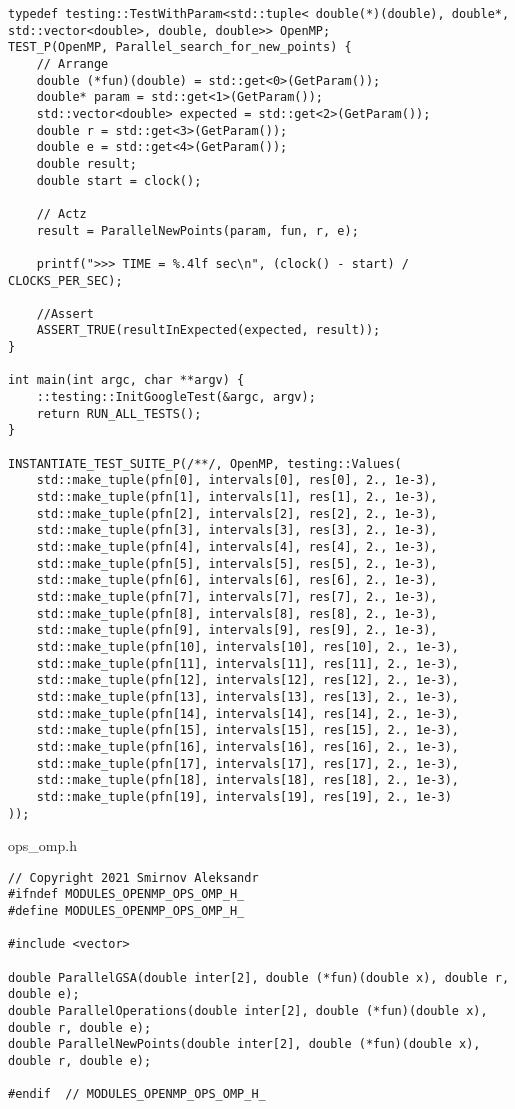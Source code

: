 \documentclass{report}
\begin{document}
\begin{lstlisting}
typedef testing::TestWithParam<std::tuple< double(*)(double), double*, std::vector<double>, double, double>> OpenMP;
TEST_P(OpenMP, Parallel_search_for_new_points) {
    // Arrange
    double (*fun)(double) = std::get<0>(GetParam());
    double* param = std::get<1>(GetParam());
    std::vector<double> expected = std::get<2>(GetParam());
    double r = std::get<3>(GetParam());
    double e = std::get<4>(GetParam());
    double result;
    double start = clock();

    // Actz
    result = ParallelNewPoints(param, fun, r, e);

    printf(">>> TIME = %.4lf sec\n", (clock() - start) / CLOCKS_PER_SEC);

    //Assert
    ASSERT_TRUE(resultInExpected(expected, result));
}

int main(int argc, char **argv) {
    ::testing::InitGoogleTest(&argc, argv);
    return RUN_ALL_TESTS();
}

INSTANTIATE_TEST_SUITE_P(/**/, OpenMP, testing::Values(
    std::make_tuple(pfn[0], intervals[0], res[0], 2., 1e-3),
    std::make_tuple(pfn[1], intervals[1], res[1], 2., 1e-3),
    std::make_tuple(pfn[2], intervals[2], res[2], 2., 1e-3),
    std::make_tuple(pfn[3], intervals[3], res[3], 2., 1e-3),
    std::make_tuple(pfn[4], intervals[4], res[4], 2., 1e-3),
    std::make_tuple(pfn[5], intervals[5], res[5], 2., 1e-3),
    std::make_tuple(pfn[6], intervals[6], res[6], 2., 1e-3),
    std::make_tuple(pfn[7], intervals[7], res[7], 2., 1e-3),
    std::make_tuple(pfn[8], intervals[8], res[8], 2., 1e-3),
    std::make_tuple(pfn[9], intervals[9], res[9], 2., 1e-3),
    std::make_tuple(pfn[10], intervals[10], res[10], 2., 1e-3),
    std::make_tuple(pfn[11], intervals[11], res[11], 2., 1e-3),
    std::make_tuple(pfn[12], intervals[12], res[12], 2., 1e-3),
    std::make_tuple(pfn[13], intervals[13], res[13], 2., 1e-3),
    std::make_tuple(pfn[14], intervals[14], res[14], 2., 1e-3),
    std::make_tuple(pfn[15], intervals[15], res[15], 2., 1e-3),
    std::make_tuple(pfn[16], intervals[16], res[16], 2., 1e-3),
    std::make_tuple(pfn[17], intervals[17], res[17], 2., 1e-3),
    std::make_tuple(pfn[18], intervals[18], res[18], 2., 1e-3),
    std::make_tuple(pfn[19], intervals[19], res[19], 2., 1e-3)
));
\end{lstlisting}

ops\_omp.h
\begin{lstlisting}
// Copyright 2021 Smirnov Aleksandr
#ifndef MODULES_OPENMP_OPS_OMP_H_
#define MODULES_OPENMP_OPS_OMP_H_

#include <vector>

double ParallelGSA(double inter[2], double (*fun)(double x), double r, double e);
double ParallelOperations(double inter[2], double (*fun)(double x), double r, double e);
double ParallelNewPoints(double inter[2], double (*fun)(double x), double r, double e);

#endif  // MODULES_OPENMP_OPS_OMP_H_
\end{lstlisting}
\end{document}
